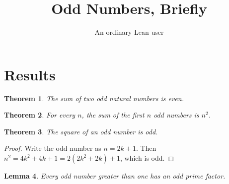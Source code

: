 \documentclass[11pt]{article}
\title{Odd Numbers, Briefly}
\author{An ordinary Lean user}
\date{}
\newtheorem{theorem}{Theorem}
\newtheorem{lemma}[theorem]{Lemma}
\newcommand{\lean}[1]{}
\begin{document}
\maketitle

\section{Results}

\begin{theorem}\label{thm:odd-add}\lean{Plain.odd_add_odd}
The sum of two odd natural numbers is even.
\end{theorem}

\begin{theorem}\label{thm:sum-odd}
For every $n$, the sum of the first $n$ odd numbers is $n^2$.
\end{theorem}

\begin{theorem}\label{thm:square}
The square of an odd number is odd.
\end{theorem}

\begin{proof}
Write the odd number as $n = 2k + 1$.
Then $n^2 = 4k^2 + 4k + 1 = 2(2k^2 + 2k) + 1$,
which is odd.
\end{proof}

\begin{lemma}\label{lem:open}
Every odd number greater than one has an odd prime factor.
\end{lemma}
\end{document}
